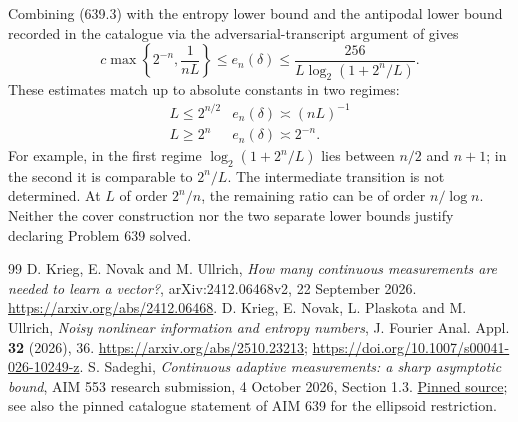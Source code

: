 \documentclass[11pt,a4paper]{article}
\theoremstyle{definition}
\theoremstyle{remark}
\numberwithin{equation}{section}
\begin{document}
Combining (639.3) with the entropy lower bound
\cite{knpw2026} and the antipodal lower bound recorded in the
catalogue via the adversarial-transcript argument of \cite{aim553} gives
\[
 c\max\left\{2^{-n},\frac1{nL}\right\}
   \le e_n(\delta)
   \le \frac{256}{L\log_2(1+2^n/L)} .
 \tag{639.17}
\]
These estimates match up to absolute constants in two regimes:
\[
\begin{array}{c|c}
 L\le2^{n/2} & e_n(\delta)\asymp (nL)^{-1}\\
 L\ge2^n     & e_n(\delta)\asymp 2^{-n}.
\end{array}
 \tag{639.18}
\]
For example, in the first regime
\(\log_2(1+2^n/L)\) lies between \(n/2\) and \(n+1\);
in the second it is comparable to \(2^n/L\).
The intermediate transition is not determined. At
\(L\) of order \(2^n/n\), the remaining ratio can be of order
\(n/\log n\). Neither the cover construction nor the two separate
lower bounds justify declaring Problem 639 solved.

\begin{thebibliography}{99}
D. Krieg, E. Novak and M. Ullrich, \emph{How many continuous measurements are needed to learn a vector?}, arXiv:2412.06468v2, 22 September 2026. \url{https://arxiv.org/abs/2412.06468}.
D. Krieg, E. Novak, L. Plaskota and M. Ullrich, \emph{Noisy nonlinear information and entropy numbers}, J. Fourier Anal. Appl. \textbf{32} (2026), 36. \url{https://arxiv.org/abs/2510.23213}; \url{https://doi.org/10.1007/s00041-026-10249-z}.
 S. Sadeghi, \emph{Continuous adaptive measurements: a sharp asymptotic bound}, AIM 553 research submission, 4 October 2026, Section 1.3. \href{https://github.com/MColbrook/AIM/blob/c4036871b0bf15cbc83e79c780b7191bcbb2cfed/research/solutions/siavash-sadeghi-553/aim553_report.tex}{Pinned source}; see also the pinned catalogue statement of AIM 639 for the ellipsoid restriction.
\end{thebibliography}
\end{document}
